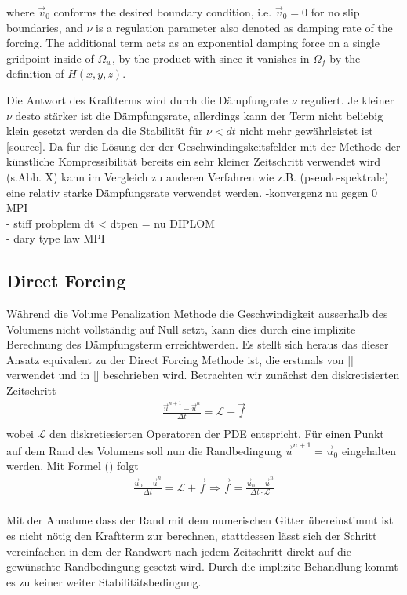 where $\vec{v}_0$ conforms the desired boundary condition, i.e. $\vec{v}_0 = 0 $ for no slip boundaries, and $\nu$ is a regulation parameter also denoted as damping rate of the forcing.
The additional term acts as an exponential damping force on a single gridpoint inside of $\Omega_w$, by the product with since it vanishes in $\Omega_f$ by the definition of $H(x,y,z)$.


Die Antwort des Kraftterms wird durch die Dämpfungrate $\nu$ reguliert. Je kleiner $\nu$ desto stärker ist die Dämpfungsrate, allerdings kann der Term
nicht beliebig klein gesetzt werden da die Stabilität für $\nu < dt$ nicht mehr gewährleistet ist [source].
Da für die Lösung der der Geschwindingskeitsfelder mit der Methode der künstliche Kompressibilität  bereits ein sehr kleiner Zeitschritt verwendet wird (s.Abb. X)
kann im Vergleich zu anderen Verfahren wie z.B. (pseudo-spektrale) eine relativ starke Dämpfungsrate verwendet werden.
-konvergenz nu gegen 0 MPI\\
- stiff probplem dt < dtpen = nu DIPLOM\\
- dary type law MPI\\
\newpage


\subsection{Direct Forcing}
Während die Volume Penalization Methode die Geschwindigkeit ausserhalb des Volumens nicht vollständig auf Null setzt,
 kann dies durch eine implizite Berechnung des Dämpfungsterm erreichtwerden. Es stellt sich heraus das dieser Ansatz equivalent
  zu der Direct Forcing Methode ist, die erstmals von [] verwendet und in [] beschrieben wird.
Betrachten wir zunächst den diskretisierten Zeitschritt
\begin{align}
    \frac{\vec{u}^{n+1} -\vec{u}^n}{\Delta t} = \mathscr{L} + \vec{f}\\
\end{align}
wobei $\mathscr{L}$ den diskretiesierten Operatoren der PDE entspricht.
Für einen Punkt auf dem Rand des Volumens soll nun die Randbedingung $\vec{u}^{n+1} = \vec{u}_0$ eingehalten werden.
Mit Formel () folgt
\begin{align}
    \frac{\vec{u}_0 -\vec{u}^n}{\Delta t} = \mathscr{L} + \vec{f} \Rightarrow \vec{f} = \frac{\vec{u}_0 -\vec{u}^n}{\Delta t\cdot \mathscr{L}}\\
\end{align}

Mit der Annahme dass der Rand mit dem numerischen Gitter übereinstimmt ist es nicht nötig den Kraftterm zur berechnen, stattdessen lässt sich der
Schritt vereinfachen in dem der Randwert nach  jedem Zeitschritt direkt auf die gewünschte Randbedingung gesetzt wird. Durch die
implizite Behandlung kommt es zu keiner weiter Stabilitätsbedingung.

